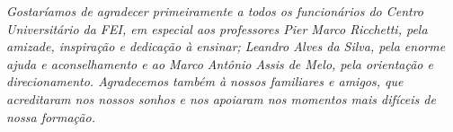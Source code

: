 \documentclass[../../layout.tex]{subfiles}
\begin{document}
\begin{dedicatoria}
\vspace*{\fill}

\noindent
\begin{flushright} 
\begin{minipage}{0.5\textwidth}
\textit{Gostaríamos de agradecer primeiramente a todos os funcionários do Centro Universitário da FEI, em especial aos professores Pier Marco Ricchetti, pela amizade, inspiração e dedicação à ensinar; Leandro Alves da Silva, pela enorme ajuda e aconselhamento e ao  Marco Antônio Assis de Melo, pela orientação e direcionamento. Agradecemos também à nossos familiares e amigos, que acreditaram nos nossos sonhos e nos apoiaram nos momentos mais difíceis de nossa formação.}
\end{minipage}
\end{flushright}

\end{dedicatoria}
\end{document}
